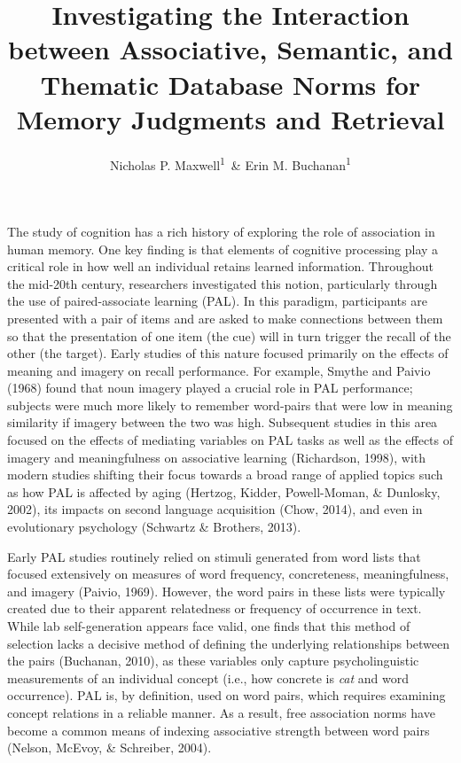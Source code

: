 \documentclass[english,man]{apa6}
\title{Investigating the Interaction between Associative, Semantic, and
Thematic Database Norms for Memory Judgments and Retrieval}
\author{Nicholas P. Maxwell\textsuperscript{1}~\& Erin M. Buchanan\textsuperscript{1}}
\affiliation{
    \vspace{0.5cm}
          \textsuperscript{1} Missouri State University  }
\theoremstyle{definition}
\theoremstyle{definition}
\theoremstyle{definition}
\theoremstyle{remark}
\begin{document}
\maketitle

\setcounter{secnumdepth}{0}



The study of cognition has a rich history of exploring the role of
association in human memory. One key finding is that elements of
cognitive processing play a critical role in how well an individual
retains learned information. Throughout the mid-20th century,
researchers investigated this notion, particularly through the use of
paired-associate learning (PAL). In this paradigm, participants are
presented with a pair of items and are asked to make connections between
them so that the presentation of one item (the cue) will in turn trigger
the recall of the other (the target). Early studies of this nature
focused primarily on the effects of meaning and imagery on recall
performance. For example, Smythe and Paivio (1968) found that noun
imagery played a crucial role in PAL performance; subjects were much
more likely to remember word-pairs that were low in meaning similarity
if imagery between the two was high. Subsequent studies in this area
focused on the effects of mediating variables on PAL tasks as well as
the effects of imagery and meaningfulness on associative learning
(Richardson, 1998), with modern studies shifting their focus towards a
broad range of applied topics such as how PAL is affected by aging
(Hertzog, Kidder, Powell-Moman, \& Dunlosky, 2002), its impacts on
second language acquisition (Chow, 2014), and even in evolutionary
psychology (Schwartz \& Brothers, 2013).

Early PAL studies routinely relied on stimuli generated from word lists
that focused extensively on measures of word frequency, concreteness,
meaningfulness, and imagery (Paivio, 1969). However, the word pairs in
these lists were typically created due to their apparent relatedness or
frequency of occurrence in text. While lab self-generation appears face
valid, one finds that this method of selection lacks a decisive method
of defining the underlying relationships between the pairs (Buchanan,
2010), as these variables only capture psycholinguistic measurements of
an individual concept (i.e., how concrete is \emph{cat} and word
occurrence). PAL is, by definition, used on word pairs, which requires
examining concept relations in a reliable manner. As a result, free
association norms have become a common means of indexing associative
strength between word pairs (Nelson, McEvoy, \& Schreiber, 2004).
\end{document}
